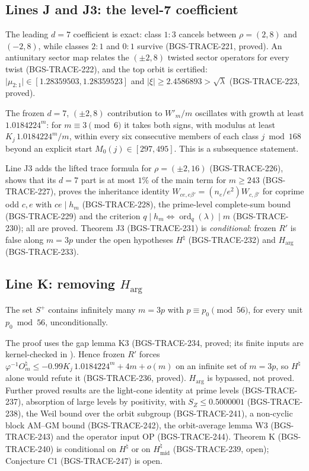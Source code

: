 \subsection{Lines J and J3: the level-7 coefficient}
\label{sec:lines-I-N-lineJ}
The leading \(d=7\) coefficient is exact: class \(1{:}3\) cancels between \(\rho=(2,8)\) and \((-2,8)\), while classes \(2{:}1\) and \(0{:}1\) survive (BGS-TRACE-221, proved). An antiunitary sector map relates the \((\pm2,8)\) twisted sector operators for every twist (BGS-TRACE-222), and the top orbit is certified: \(\lvert\mu_{2:1}\rvert\in[1.28359503,1.28359523]\) and \(\lvert\xi\rvert\ge2.4586893>\sqrt\lambda\) (BGS-TRACE-223, proved).
\begin{theorem}
The frozen \(d=7\), \((\pm2,8)\) contribution to \(W'_m/m\) oscillates with growth at least \(1.0184224^m\): for \(m\equiv3\pmod6\) it takes both signs, with modulus at least \(K_j\,1.0184224^m/m\), within every six consecutive members of each class \(j\bmod168\) beyond an explicit start \(M_0(j)\in[297,495]\). This is a subsequence statement.
\end{theorem}
Line J3 adds the lifted trace formula for \(\rho=(\pm2,16)\) (BGS-TRACE-226), shows that its \(d=7\) part is at most \(1\%\) of the main term for \(m\ge243\) (BGS-TRACE-227), proves the inheritance identity \(W_{ce,e\beta'}=(n_e/e^2)W_{c,\beta'}\) for coprime odd \(c,e\) with \(ce\mid h_m\) (BGS-TRACE-228), the prime-level complete-sum bound (BGS-TRACE-229) and the criterion \(q\mid h_m\iff\operatorname{ord}_q(\lambda)\mid m\) (BGS-TRACE-230); all are proved. Theorem J3 (BGS-TRACE-231) is \emph{conditional}: frozen \(R'\) is false along \(m=3p\) under the open hypotheses \(H^\natural\) (BGS-TRACE-232) and \(H_{\arg}\) (BGS-TRACE-233).

\subsection{Line K: removing \texorpdfstring{$H_{\arg}$}{H\_arg}}
\label{sec:lines-I-N-lineK}
\begin{theorem}
The set \(S^+\) contains infinitely many \(m=3p\) with \(p\equiv p_0\pmod{56}\), for every unit \(p_0\bmod56\), unconditionally.
\end{theorem}
The proof uses the gap lemma K3 (BGS-TRACE-234, proved; its finite inputs are kernel-checked in ). Hence frozen \(R'\) forces \(\varphi^{-1}O^\natural_m\le-0.99K_j\,1.0184224^m+4m+o(m)\) on an infinite set of \(m=3p\), so \(H^\natural\) alone would refute it (BGS-TRACE-236, proved). \(H_{\arg}\) is bypassed, not proved. Further proved results are the light-cone identity at prime levels (BGS-TRACE-237), absorption of large levels by positivity, with \(S_Z\le0.5000001\) (BGS-TRACE-238), the Weil bound over the orbit subgroup (BGS-TRACE-241), a non-cyclic block AM--GM bound (BGS-TRACE-242), the orbit-average lemma W3 (BGS-TRACE-243) and the operator input OP (BGS-TRACE-244). Theorem K (BGS-TRACE-240) is conditional on \(H^\natural\) or on \(H^\natural_{\mathrm{mid}}\) (BGS-TRACE-239, open); Conjecture C1 (BGS-TRACE-247) is open.

